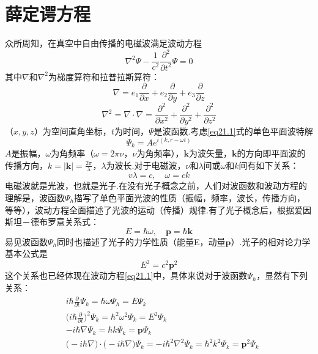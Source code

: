 \section[薛定谔方程]{薛定谔方程} \label{sec:02.01} %

众所周知，在真空中自由传播的电磁波满足波动方程
\begin{equation}\label{eq21.1}
	\nabla^{2}\varPsi-\frac{1}{c^{2}}\frac{\partial^{2}}{\partial t^{2}}\varPsi=0
\end{equation}
其中$\nabla$和$\nabla^{2}$为梯度算符和拉普拉斯算符：
\begin{equation}\label{eq21.2}
	\nabla=e_{1}\frac{\partial}{\partial x}+e_{2}\frac{\partial}{\partial y}+e_{3}\frac{\partial}{\partial z}
\end{equation}
\begin{equation}\label{eq21.3}
	\nabla^{2}=\nabla\cdot\nabla=\frac{\partial^{2}}{\partial x^{2}}+\frac{\partial^{2}}{\partial y^{2}}+\frac{\partial^{2}}{\partial z^{2}}
\end{equation}\eqshort
（$x,y,z$）为空间直角坐标，$t$为时间，$\varPsi$是波函数.考虑\eqref{eq21.1}式的单色平面波特解
\begin{equation}\label{eq21.4}
	\varPsi_{k}=Ae^{i(k,r-\omega t)}
\end{equation}
$A$是振幅，$\omega$为角频率（$\omega=2\pi\nu$，$\nu$为角频率），$\boldsymbol{k}$为波矢量，$\boldsymbol{k}$的方向即平面波的传播方向，$k=|\boldsymbol{k}|=\frac{2\pi}{\lambda}$，$\lambda$为波长.对于电磁波，$\nu$和$\lambda$间或$\omega$和$k$间有如下关系：
\begin{equation}\label{eq21.5}
	v\lambda=c,\quad \omega=ck
\end{equation}
电磁波就是光波，也就是光子.在没有光子概念之前，人们对波函数和波动方程的理解是，波函数$\varPsi_{h}$描写了单色平面光波的性质（振幅，频率，波长，传播方向，等等），波动方程全面描述了光波的运动（传播）规律.有了光子概念后，根据爱因斯坦－德布罗意关系式：
\begin{equation}\label{eq21.6}
	E=\hbar\omega,\quad \boldsymbol{p}=\hbar \boldsymbol{k}
\end{equation}
易见波函数$\varPsi_{h}$同时也描述了光子的力学性质（能量E，动量$\boldsymbol{p}$）.光子的相对论力学基本公式是
\begin{equation}\label{eq21.7}
	E^{2}=c^{2}\boldsymbol{p}^{2}
\end{equation}
这个关系也已经体现在波动方程\eqref{eq21.1}中，具体来说对于波函数$\varPsi_{h}$，显然有下列关系：
\begin{equation}\label{eq21.8}
	\begin{aligned}
		&i\hbar\frac{\partial}{\partial t}\varPsi_{k}=\hbar\omega\varPsi_{h}=E\varPsi_{k} \\
		&\bigg(i\hbar\frac{\partial}{\partial t} \bigg)^{2}\varPsi_{k}=\hbar^{2}\omega^{2}\varPsi_{k}=E^{2}\varPsi_{k} \\
		&-i\hbar\nabla\varPsi_{k}=\hbar k\varPsi_{k}=\boldsymbol{p}\varPsi_{k} \\
		&\bigg(-i\hbar\nabla \bigg)\cdot\bigg(-i\hbar\nabla \bigg)\varPsi_{k}=
		-i\hbar^{2}\nabla^{2}\varPsi_{k}=\hbar^{2}k^{2}\varPsi_{k}=\boldsymbol{p}^{2}\varPsi_{k}
	\end{aligned}
\end{equation}\eqnormal
